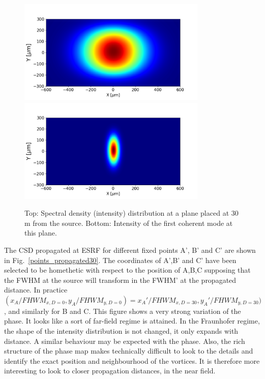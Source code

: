 \documentclass{iucr}              %
\newcommand{\inblue}[1]{{\color{blue}#1}}
\begin{document}
\begin{figure}\label{spectral_density_propagated}%
\caption{Top: Spectral density (intensity) distribution at a plane placed at 30 m from the source. Bottom: Intensity of the first coherent mode at this plane.}
\includegraphics[width=9.0cm]{Figures/spectral_density_upto1099_propagated.png}
\includegraphics[width=9.0cm]{Figures/spectral_density_upto0_propagated.png}
\end{figure}

The CSD propagated at ESRF for different fixed points A', B' and C' are shown in \inblue{Fig.~\ref{points_propagated30}}. The coordinates of A',B' and C' have been selected to be homethetic with respect to the position of A,B,C supposing that the FWHM at the source will transform in the FWHM' at the propagated distance. In practice $(x_A/FHWM_{x,D=0},y_A/FHWM_{y,D=0})=x_A'/FHWM_{x,D=30},y_A'/FHWM_{y,D=30})$, and similarly for B and C. This figure shows a very strong variation of the phase. It looks like a sort of far-field regime is attained. In the Fraunhofer regime, the shape of the intensity distribution is not changed, it only expands with distance. A similar behaviour may be expected with the phase. Also, the rich structure of the phase map makes technically difficult to look to the details and identify the exact position and neighbourhood of the vortices. It is therefore more interesting to look to closer propagation distances, in the near field. 
\end{document}
